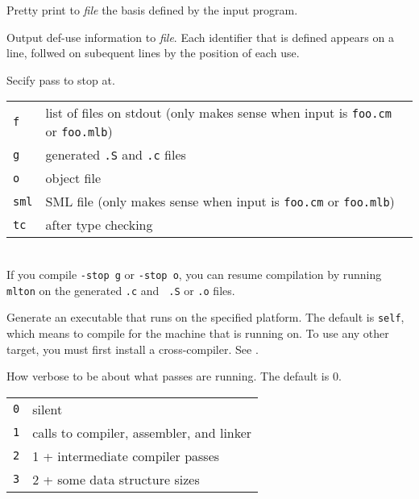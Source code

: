\begin{description}
Pretty print to {\it file} the basis defined by the input program.

Output def-use information to {\it file}.  Each identifier that is
defined appears on a line, follwed on subequent lines by the position
of each use.

Secify pass to stop at.\\
\hspace*{0.5in}
\begin{tabular}{l|l}
\hline
{\tt f} & list of files on stdout (only makes sense when input is {\tt foo.cm} or {\tt foo.mlb})\\
{\tt g} & generated {\tt .S} and {\tt .c} files\\
{\tt o} & object file\\
{\tt sml} & SML file (only makes sense when input is {\tt foo.cm} or {\tt foo.mlb})\\
{\tt tc} & after type checking\\
\end{tabular}\\
If you compile {\tt -stop g} or {\tt -stop o}, you can resume
compilation by running {\tt mlton} on the generated {\tt .c} and {\tt
.S} or {\tt .o} files. 

Generate an executable that runs on the specified platform.  The default
is {\tt self}, which means to compile for the machine that {\mlton} is
running on.  To use any other target, you must first install a
cross-compiler.  See .

How verbose to be about what passes are running.  The default is 0.\\
\hspace*{0.5in}
\begin{tabular}{l|l}
\hline
{\tt 0} & silent\\
{\tt 1} & calls to compiler, assembler, and linker\\
{\tt 2} & 1 + intermediate compiler passes\\
{\tt 3} & 2 + some data structure sizes\\
\end{tabular}\\

\end{description}


